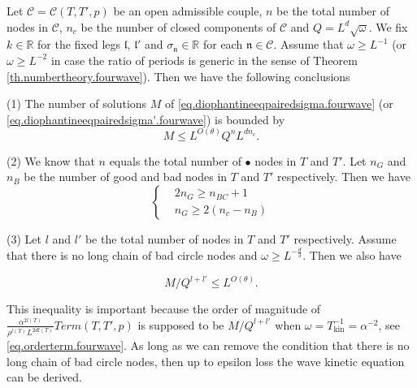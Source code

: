 \begin{prop}\label{prop.counting.fourwave}
Let $\mathcal{C}=\mathcal{C}(T,T',p)$ be an open admissible couple, $n$ be the total number of nodes in $\mathcal{C}$, $n_c$ be the number of closed components of $\mathcal{C}$ and $Q=L^{d}\sqrt{\omega}$. We fix $k\in \mathbb{R}$ for the fixed legs $\mathfrak{l}$, $\mathfrak{l}'$ and $\sigma_{\mathfrak{n}}\in\mathbb{R}$ for each $\mathfrak{n}\in \mathcal{C}$. Assume that $\omega\ge L^{-1}$ (or $\omega\ge L^{-2}$ in case the ratio of periods is generic in the sense of Theorem \ref{th.numbertheory.fourwave}). Then we have the following conclusions

(1) The number of solutions $M$ of \eqref{eq.diophantineeqpairedsigma.fourwave} (or \eqref{eq.diophantineeqpairedsigma'.fourwave}) is bounded by 
\begin{equation}\label{eq.countingbd0.fourwave}
    M\leq L^{O(\theta)} Q^{n} L^{dn_c}.
\end{equation}

(2) We know that $n$ equals the total number of $\bullet$ nodes in $T$ and $T'$. Let $n_G$ and $n_B$ be the number of good and bad nodes in $T$ and $T'$ respectively. Then we have 
\begin{equation}\label{eq.ineqn_Gn_B.fourwave}
    \left\{\begin{aligned}
        & 2n_G \ge n_{BC}+1
        \\
        & n_G \ge 2(n_c - n_B)
    \end{aligned}\right.
\end{equation}




(3) Let $l$ and $l'$ be the total number of nodes in $T$ and $T'$ respectively. Assume that there is no long chain of bad circle nodes and $\omega \ge L^{-\frac{d}{3}}$. Then we also have 

\begin{equation}\label{eq.countingbd1.fourwave}
    M/Q^{l+l'}\leq L^{O(\theta)}. 
\end{equation}

This inequality is important because the order of magnitude of $\frac{\alpha^{2l(T)}}{\rho^{l(T)}L^{2dl(T)}}Term(T,T',p)$ is supposed to be  $M/Q^{l+l'}$ when $\omega=T_{\text{kin}}^{-1} = \alpha^{-2}$, see \eqref{eq.orderterm.fourwave}. As long as we can remove the condition that there is no long chain of bad circle nodes, then up to epsilon loss the wave kinetic equation can be derived.

\end{prop}
